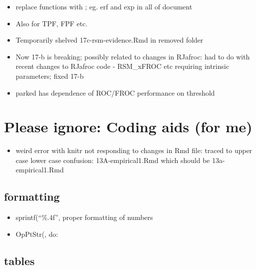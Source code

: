 \documentclass[
]{book}
\providecommand{\tightlist}{%
  \setlength{\itemsep}{0pt}\setlength{\parskip}{0pt}}
\begin{document}
\begin{itemize}
\tightlist
\item
  replace functions with \text{}; eg. erf and exp in all of document
\item
  Also for TPF, FPF etc.
\item
  Temporarily shelved 17c-rsm-evidence.Rmd in removed folder
\item
  Now 17-b is breaking; possibly related to changes in RJafroc: had to do with recent changes to RJafroc code - RSM\_xFROC etc requiring intrinsic parameters; fixed 17-b
\item
  parked has dependence of ROC/FROC performance on threshold
\end{itemize}

\hypertarget{please-ignore-coding-aids-for-me}{%
\section*{Please ignore: Coding aids (for me)}\label{please-ignore-coding-aids-for-me}}

\begin{itemize}
\tightlist
\item
  weird error with knitr not responding to changes in Rmd file: traced to upper case lower case confusion: 13A-empirical1.Rmd which should be 13a-empirical1.Rmd
\end{itemize}

\hypertarget{formatting}{%
\subsection{formatting}\label{formatting}}

\begin{itemize}
\tightlist
\item
  sprintf(``\%.4f'', proper formatting of numbers
\item
  OpPtStr(, do:
\end{itemize}

\hypertarget{tables}{%
\subsection{tables}\label{tables}}
\end{document}
